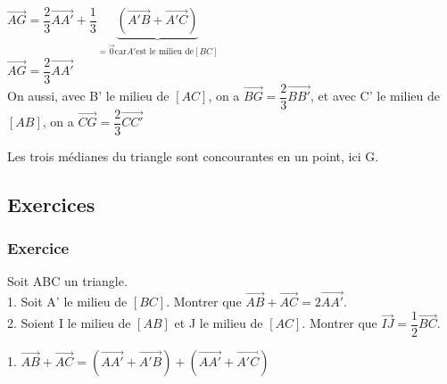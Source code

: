 $ \overrightarrow{AG} = \dfrac{2}{3} \overrightarrow{AA'} + \dfrac{1}{3} \underbrace{\left(\overrightarrow{A'B} + \overrightarrow{A'C}\right)}_{= \overrightarrow{0} \textrm {car} A' \textrm {est le milieu de} \left[BC\right]} $\\

$ \overrightarrow{AG} = \dfrac{2}{3} \overrightarrow{AA'} $\\

On aussi, avec B' le milieu de $\left[AC\right]$, on a $\overrightarrow{BG} = \dfrac{2}{3} \overrightarrow{BB'} $, et avec C' le milieu de $\left[AB\right]$, on a $\overrightarrow{CG} = \dfrac{2}{3} \overrightarrow{CC'} $

Les trois médianes du triangle sont concourantes en un point, ici G.

\newpage

\subsection{Exercices}

\subsubsection{Exercice }

Soit ABC un triangle. \\

1. Soit A' le milieu de $\left[BC\right]$. Montrer que $\overrightarrow{AB} + \overrightarrow{AC} = 2\overrightarrow{AA'}$. \\

2. Soient I le milieu de $\left[AB\right]$ et J le milieu de $\left[AC\right]$. Montrer que $\overrightarrow{IJ} = \dfrac{1}{2} \overrightarrow{BC}$.


1. $\overrightarrow{AB} + \overrightarrow{AC} = \left(\overrightarrow{AA'} + \overrightarrow{A'B}\right) + \left(\overrightarrow{AA'} + \overrightarrow{A'C}\right) $\\

